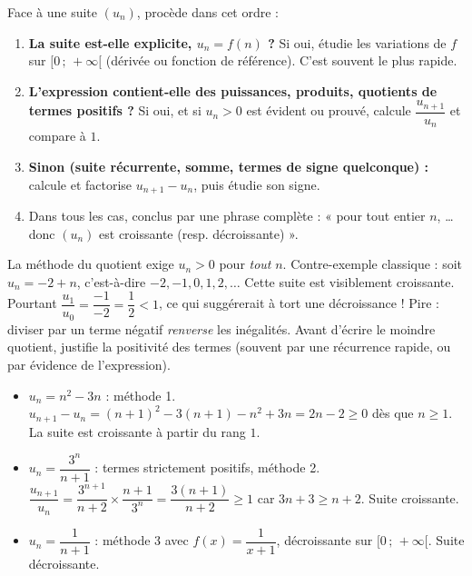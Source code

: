 \documentclass[11pt]{article}
\begin{document}
\begin{methode}
Face à une suite $(u_n)$, procède dans cet ordre :
\begin{enumerate}
\item \textbf{La suite est-elle explicite, $u_n = f(n)$ ?} Si oui, étudie les variations de $f$ sur $[0\,;\,+\infty[$ (dérivée ou fonction de référence). C'est souvent le plus rapide.
\item \textbf{L'expression contient-elle des puissances, produits, quotients de termes positifs ?} Si oui, et si $u_n > 0$ est évident ou prouvé, calcule $\dfrac{u_{n+1}}{u_n}$ et compare à $1$.
\item \textbf{Sinon (suite récurrente, somme, termes de signe quelconque) :} calcule et factorise $u_{n+1} - u_n$, puis étudie son signe.
\item Dans tous les cas, conclus par une phrase complète : « pour tout entier $n$, \dots donc $(u_n)$ est croissante (resp. décroissante) ».
\end{enumerate}
\end{methode}

\begin{attention}
La méthode du quotient exige $u_n > 0$ pour \emph{tout} $n$. Contre-exemple classique : soit $u_n = -2 + n$, c'est-à-dire $-2, -1, 0, 1, 2, \dots$ Cette suite est visiblement croissante. Pourtant $\dfrac{u_1}{u_0} = \dfrac{-1}{-2} = \dfrac{1}{2} < 1$, ce qui suggérerait à tort une décroissance ! Pire : diviser par un terme négatif \emph{renverse} les inégalités. Avant d'écrire le moindre quotient, justifie la positivité des termes (souvent par une récurrence rapide, ou par évidence de l'expression).
\end{attention}

\begin{exemplebox}
\begin{itemize}
\item $u_n = n^2 - 3n$ : méthode 1. $u_{n+1} - u_n = (n+1)^2 - 3(n+1) - n^2 + 3n = 2n - 2 \geq 0$ dès que $n \geq 1$. La suite est croissante à partir du rang $1$.
\item $u_n = \dfrac{3^n}{n+1}$ : termes strictement positifs, méthode 2. $\dfrac{u_{n+1}}{u_n} = \dfrac{3^{n+1}}{n+2} \times \dfrac{n+1}{3^n} = \dfrac{3(n+1)}{n+2} \geq 1$ car $3n+3 \geq n+2$. Suite croissante.
\item $u_n = \dfrac{1}{n+1}$ : méthode 3 avec $f(x) = \dfrac{1}{x+1}$, décroissante sur $[0\,;\,+\infty[$. Suite décroissante.
\end{itemize}
\end{exemplebox}
\end{document}
